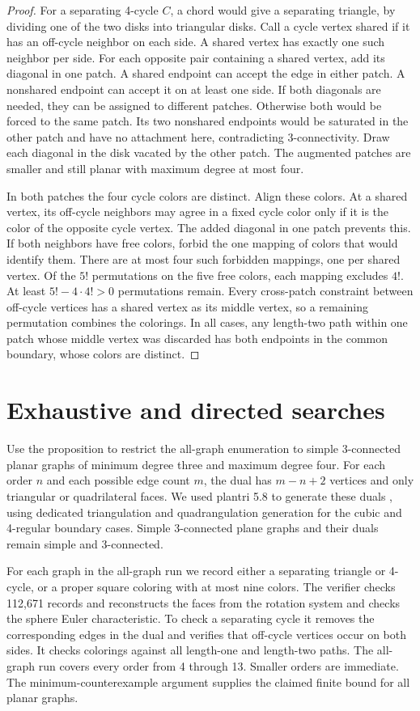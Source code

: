 \documentclass[11pt]{article}
\newcommand{\fullbound}{13}
\begin{document}
\begin{proof}
For a separating 4-cycle \(C\), a chord would give a
separating triangle, by dividing one of the two disks
into triangular disks. Call a cycle vertex shared if it has
an off-cycle neighbor on each side. A shared vertex has
exactly one such neighbor per side. For each opposite pair
containing a shared vertex, add its diagonal in one patch.
A shared endpoint can accept the edge in either patch. A
nonshared endpoint can accept it on at least one side.
If both diagonals are needed, they can be assigned to
different patches. Otherwise both would be forced to the
same patch. Its two nonshared endpoints would be saturated
in the other patch and have no attachment here, contradicting
3-connectivity. Draw each diagonal in the disk vacated by
the other patch. The augmented patches are smaller and still
planar with maximum degree at most four.

In both patches the four cycle colors are distinct.
Align these colors. At a shared vertex, its off-cycle
neighbors may agree in a fixed cycle color only if it is
the color of the opposite cycle vertex. The added diagonal
in one patch prevents this. If both neighbors have free
colors, forbid the one mapping of colors that would identify
them. There are at most four such forbidden mappings,
one per shared vertex. Of the \(5!\) permutations on the
five free colors, each mapping excludes \(4!\). At least
\(5!-4\cdot4!>0\) permutations remain. Every cross-patch
constraint between off-cycle vertices has a shared vertex
as its middle vertex, so a remaining permutation combines
the colorings. In all cases, any length-two path within
one patch whose middle vertex was discarded has both
endpoints in the common boundary, whose colors are distinct.
\end{proof}

\section{Exhaustive and directed searches}
Use the proposition to restrict the all-graph enumeration to
simple 3-connected planar graphs of minimum degree three and
maximum degree four. For each order \(n\) and each possible
edge count \(m\), the dual has \(m-n+2\) vertices and only
triangular or quadrilateral faces. We used plantri 5.8 to
generate these duals \cite{plantri}, using dedicated
triangulation and quadrangulation generation for the cubic
and 4-regular boundary cases. Simple 3-connected plane graphs
and their duals remain simple and 3-connected.

For each graph in the all-graph run we record either a separating
triangle or 4-cycle, or a proper square coloring with at most
nine colors. The verifier checks 112,671 records and reconstructs the faces from the
rotation system and checks the sphere Euler characteristic.
To check a separating cycle it removes the corresponding edges
in the dual and verifies that off-cycle vertices occur on
both sides. It checks colorings against all length-one and
length-two paths. The all-graph run covers every order from
4 through \fullbound{}. Smaller orders are immediate. The
minimum-counterexample argument supplies the claimed finite
bound for all planar graphs.
\end{document}
